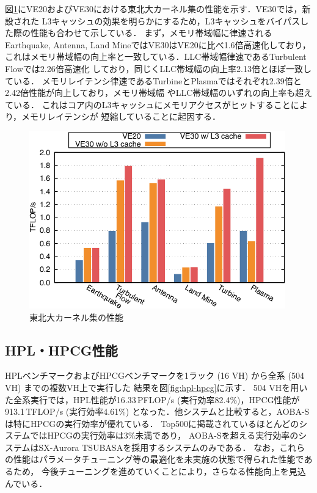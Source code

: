 ﻿\documentclass[submit,techrep,noauthor]{ipsj}
\begin{document}
図\ref{fig:isc-kernels}にVE20およびVE30における東北大カーネル集の性能を示す．VE30では，新設された
L3キャッシュの効果を明らかにするため，L3キャッシュをバイパスした際の性能も合わせて示している．
まず，メモリ帯域幅に律速されるEarthquake, Antenna, Land MineではVE30はVE20に比べ1.6倍高速化しており，
これはメモリ帯域幅の向上率と一致している．LLC帯域幅律速であるTurbulent Flowでは2.26倍高速化
しており，同じくLLC帯域幅の向上率2.13倍とほぼ一致している．
メモリレイテンシ律速であるTurbineとPlasmaではそれぞれ2.39倍と2.42倍性能が向上しており，メモリ帯域幅
やLLC帯域幅のいずれの向上率も超えている．
これはコア内のL3キャッシュにメモリアクセスがヒットすることにより，メモリレイテンシが
短縮していることに起因する．

\begin{figure}[tb]
  \centering
  \includegraphics{figs/isc_kernels.pdf}
  \caption{東北大カーネル集の性能}\label{fig:isc-kernels}
\end{figure}


\subsection{HPL・HPCG性能}\label{sec:hpl-hpcg}

HPLベンチマークおよびHPCGベンチマークを1ラック (16 VH) から全系 (504 VH) までの複数VH上で実行した
結果を図\ref{fig:hpl-hpcg}に示す．
504 VHを用いた全系実行では，HPL性能が16.33\,PFLOP/s (実行効率82.4\%)，HPCG性能が913.1\,TFLOP/s 
(実行効率4.61\%) となった．他システムと比較すると，AOBA-Sは特にHPCGの実行効率が優れている．
Top500に掲載されているほとんどのシステムではHPCGの実行効率は3\%未満であり，
AOBA-Sを超える実行効率のシステムはSX-Aurora TSUBASAを採用するシステムのみである．
なお，これらの性能はパラメータチューニング等の最適化を未実施の状態で得られた性能であるため，
今後チューニングを進めていくことにより，さらなる性能向上を見込んでいる．
\end{document}
